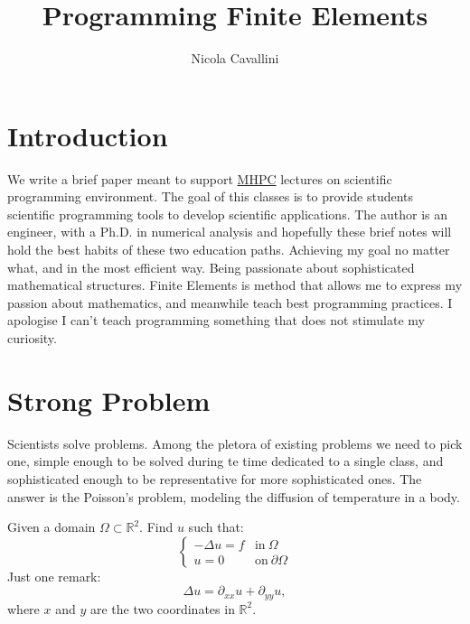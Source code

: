 \documentclass[11pt]{amsart}
\title{Programming Finite Elements}
\author{Nicola Cavallini}
\begin{document}
\renewcommand{\theFancyVerbLine}{
  \sffamily\textcolor[rgb]{0.5,0.5,0.5}{\scriptsize\arabic{FancyVerbLine}}}
\maketitle

\section{Introduction}
We write a brief paper meant to support \href{http://www.mhpc.it/}{MHPC} 
lectures on scientific programming environment. The goal of this classes 
is to provide students scientific programming tools to develop scientific applications. 
The author is an engineer, with a Ph.D. in numerical analysis and hopefully these brief 
notes will hold the best habits of these two education paths. Achieving my goal no 
matter what, and in the most efficient way. Being passionate about sophisticated 
mathematical structures. Finite Elements is method that allows me to express my passion 
about mathematics, and meanwhile teach best programming practices. I apologise 
I can't teach programming something that does not stimulate my curiosity.

\section{Strong Problem}
Scientists solve problems. Among the pletora of existing problems 
we need to pick one, simple enough to be solved during te time dedicated to a single 
class, and sophisticated enough to be representative for more sophisticated ones. 
The answer is the Poisson's problem,
modeling the diffusion of temperature in a body.

Given a domain $\Omega\subset \mathbb{R}^2$.
Find $u$ such that:
\[
\left\{
\begin{array}{ll}
-\Delta u = f & \mathrm{in}\ \Omega \\
u = 0  & \mathrm{on}\ \partial\Omega
\end{array}
\right.
\]
Just one remark:
\[
\Delta u = \partial_{xx} u + \partial_{yy} u,
\]
where $x$ and $y$ are the two coordinates in $\mathbb{R}^2$.
\end{document}

